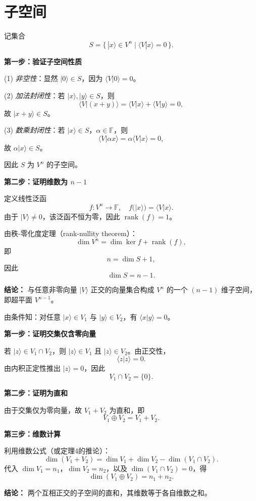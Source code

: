 ﻿%
\section{子空间}

\begin{solution}

\answer
记集合
\[
S=\{\,|x\rangle\in V^n \mid \langle V|x\rangle=0\,\}.
\]

\textbf{第一步：验证子空间性质}

(1) \textit{非空性}：显然 $|0\rangle\in S$，因为 $\langle V|0\rangle=0$。

(2) \textit{加法封闭性}：若 $|x\rangle,|y\rangle\in S$，则
\[
\langle V| (x+y)\rangle=\langle V|x\rangle+\langle V|y\rangle=0,
\]
故 $|x+y\rangle\in S$。

(3) \textit{数乘封闭性}：若 $|x\rangle\in S$，$\alpha\in \mathbb{F}$，则
\[
\langle V|\alpha x\rangle=\alpha \langle V|x\rangle=0,
\]
故 $\alpha|x\rangle\in S$。

因此 $S$ 为 $V^n$ 的子空间。

\textbf{第二步：证明维数为 $n-1$}

定义线性泛函
\[
f:V^n\to \mathbb{F},\quad f(|x\rangle)=\langle V|x\rangle.
\]
由于 $|V\rangle\neq 0$，该泛函不恒为零，因此 $\operatorname{rank}(f)=1$。

由秩-零化度定理（rank-nullity theorem）：
\[
\dim V^n = \dim \ker f + \operatorname{rank}(f),
\]
即
\[
n = \dim S + 1,
\]
因此
\[
\dim S = n-1.
\]

\textbf{结论：}
与任意非零向量 $|V\rangle$ 正交的向量集合构成 $V^n$ 的一个 $(n-1)$ 维子空间，即超平面 $V^{n-1}$。
\end{solution}


\begin{solution}[正交子空间直和的维数公式]

\answer
由条件知：对任意 $|x\rangle\in V_1$ 与 $|y\rangle\in V_2$，有 $\langle x|y\rangle=0$。

\textbf{第一步：证明交集仅含零向量}

若 $|z\rangle\in V_1\cap V_2$，则 $|z\rangle\in V_1$ 且 $|z\rangle\in V_2$。由正交性，
\[
\langle z|z\rangle=0.
\]
由内积正定性推出 $|z\rangle=0$，因此
\[
V_1\cap V_2=\{0\}.
\]

\textbf{第二步：证明为直和}

由于交集仅为零向量，故 $V_1+V_2$ 为直和，即
\[
V_1\oplus V_2=V_1+V_2.
\]

\textbf{第三步：维数计算}

利用维数公式（或定理4的推论）：
\[
\dim(V_1+V_2)=\dim V_1+\dim V_2-\dim(V_1\cap V_2).
\]
代入 $\dim V_1=n_1$，$\dim V_2=n_2$，以及 $\dim(V_1\cap V_2)=0$，得
\[
\dim(V_1\oplus V_2)=n_1+n_2.
\]

\textbf{结论：}
两个互相正交的子空间的直和，其维数等于各自维数之和。
\end{solution}